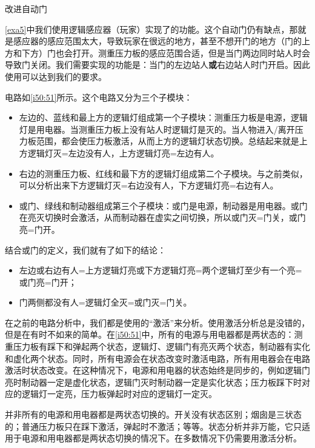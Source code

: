 \begin{example}{改进自动门}{}

\autoref{exa5}中我们使用逻辑感应器（玩家）实现了的功能。这个自动门仍有缺点，那就是感应器的感应范围太大，导致玩家在很远的地方，甚至不想开门的地方（门的上方和下方）门也会打开。测重压力板的感应范围合适，但是当门两边同时站人时会导致门关闭。我们需要实现的功能是：当门的左边站人\textbf{或}右边站人时门开启。因此使用可以达到我们的要求。

\begin{figure}[H]
\centering
{}%
%
\caption{}
\label{i50:51}
\end{figure}

电路如\autoref{i50:51}所示。这个电路又分为三个子模块：
\begin{itemize}
\item 左边的、蓝线和最上方的逻辑灯组成第一个子模块：测重压力板是电源，逻辑灯是用电器。当测重压力板上没有站人时逻辑灯是灭的。当人物进入/离开压力板范围，都会使压力板激活，从而上方的逻辑灯状态切换。总结起来就是上方逻辑灯灭=左边没有人，上方逻辑灯亮=左边有人。
\item 右边的测重压力板、红线和最下方的逻辑灯组成第二个子模块。与之前类似，可以分析出来下方逻辑灯灭=右边没有人，下方逻辑灯亮=右边有人。
\item 或门、绿线和制动器组成第三个子模块：或门是电源，制动器是用电器。或门在亮灭切换时会激活，从而制动器在虚实之间切换，所以或门灭=门关，或门亮=门开。
\end{itemize}

结合或门的定义，我们就有了如下的结论：
\begin{itemize}
\item 左边或右边有人=上方逻辑灯亮或下方逻辑灯亮=两个逻辑灯至少有一个亮=或门亮=门开；
\item 门两侧都没有人=逻辑灯全灭=或门灭=门关。
\end{itemize}

在之前的电路分析中，我们都是使用的“激活”来分析。使用激活分析总是没错的，但是在有时不如来的简单。在\autoref{i50:51}中，所有的电源与用电器都是两状态的：测重压力板有踩下和弹起两个状态，逻辑灯、逻辑门有亮灭两个状态，制动器有实化和虚化两个状态。同时，所有电源会在状态改变时激活电路，所有用电器会在电路激活时状态改变。在这种情况下，电源和用电器的状态始终是同步的，例如逻辑门亮时制动器一定是虚化状态，逻辑门灭时制动器一定是实化状态；压力板踩下时对应的逻辑灯一定亮，压力板弹起时对应的逻辑灯一定灭。
\begin{remark*}{}{}
并非所有的电源和用电器都是两状态切换的。开关没有状态区别；烟囱是三状态的；普通压力板只在踩下激活，弹起时不激活；等等。状态分析并非万能，它只适用于电源和用电器都是两状态切换的情况下。在多数情况下仍需要用激活分析。
\end{remark*}
\end{example}

